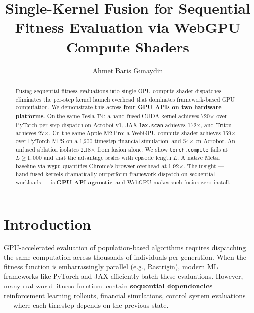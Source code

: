 \documentclass[sigconf,nonacm]{acmart}
\begin{document}
\title{Single-Kernel Fusion for Sequential Fitness Evaluation via WebGPU Compute Shaders}

\author{Ahmet Baris Gunaydin}

\begin{abstract}
Fusing sequential fitness evaluations into single GPU compute shader dispatches eliminates the per-step kernel launch overhead that dominates framework-based GPU computation. We demonstrate this across \textbf{four GPU APIs on two hardware platforms}. On the same Tesla T4: a hand-fused CUDA kernel achieves 720$\times$ over PyTorch per-step dispatch on Acrobot-v1, JAX \texttt{lax.scan} achieves 172$\times$, and Triton achieves 27$\times$. On the same Apple M2 Pro: a WebGPU compute shader achieves 159$\times$ over PyTorch MPS on a 1,500-timestep financial simulation, and 54$\times$ on Acrobot. An unfused ablation isolates 2.18$\times$ from fusion alone. We show \texttt{torch.compile} fails at $L \geq 1{,}000$ and that the advantage scales with episode length $L$. A native Metal baseline via wgpu quantifies Chrome's browser overhead at 1.92$\times$. The insight --- hand-fused kernels dramatically outperform framework dispatch on sequential workloads --- is \textbf{GPU-API-agnostic}, and WebGPU makes such fusion zero-install.
\end{abstract}


\maketitle

\section{Introduction}

GPU-accelerated evaluation of population-based algorithms requires dispatching the same computation across thousands of individuals per generation. When the fitness function is embarrassingly parallel (e.g., Rastrigin), modern ML frameworks like PyTorch and JAX efficiently batch these evaluations. However, many real-world fitness functions contain \textbf{sequential dependencies} --- reinforcement learning rollouts, financial simulations, control system evaluations --- where each timestep depends on the previous state.
\end{document}
